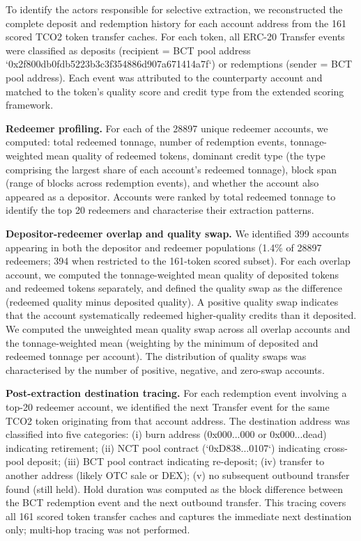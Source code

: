 \documentclass[11pt]{article}
\begin{document}
To identify the actors responsible for selective extraction, we reconstructed the complete deposit and redemption history for each account address from the 161 scored TCO2 token transfer caches. For each token, all ERC-20 Transfer events were classified as deposits (recipient = BCT pool address `0x2f800db0fdb5223b3c3f354886d907a671414a7f`) or redemptions (sender = BCT pool address). Each event was attributed to the counterparty account and matched to the token's quality score and credit type from the extended scoring framework.

\textbf{Redeemer profiling.} For each of the 28897 unique redeemer accounts, we computed: total redeemed tonnage, number of redemption events, tonnage-weighted mean quality of redeemed tokens, dominant credit type (the type comprising the largest share of each account's redeemed tonnage), block span (range of blocks across redemption events), and whether the account also appeared as a depositor. Accounts were ranked by total redeemed tonnage to identify the top 20 redeemers and characterise their extraction patterns.

\textbf{Depositor-redeemer overlap and quality swap.} We identified 399 accounts appearing in both the depositor and redeemer populations (1.4\% of 28897 redeemers; 394 when restricted to the 161-token scored subset). For each overlap account, we computed the tonnage-weighted mean quality of deposited tokens and redeemed tokens separately, and defined the quality swap as the difference (redeemed quality minus deposited quality). A positive quality swap indicates that the account systematically redeemed higher-quality credits than it deposited. We computed the unweighted mean quality swap across all overlap accounts and the tonnage-weighted mean (weighting by the minimum of deposited and redeemed tonnage per account). The distribution of quality swaps was characterised by the number of positive, negative, and zero-swap accounts.

\textbf{Post-extraction destination tracing.} For each redemption event involving a top-20 redeemer account, we identified the next Transfer event for the same TCO2 token originating from that account address. The destination address was classified into five categories: (i) burn address (0x000...000 or 0x000...dead) indicating retirement; (ii) NCT pool contract (`0xD838...0107`) indicating cross-pool deposit; (iii) BCT pool contract indicating re-deposit; (iv) transfer to another address (likely OTC sale or DEX); (v) no subsequent outbound transfer found (still held). Hold duration was computed as the block difference between the BCT redemption event and the next outbound transfer. This tracing covers all 161 scored token transfer caches and captures the immediate next destination only; multi-hop tracing was not performed.
\end{document}
